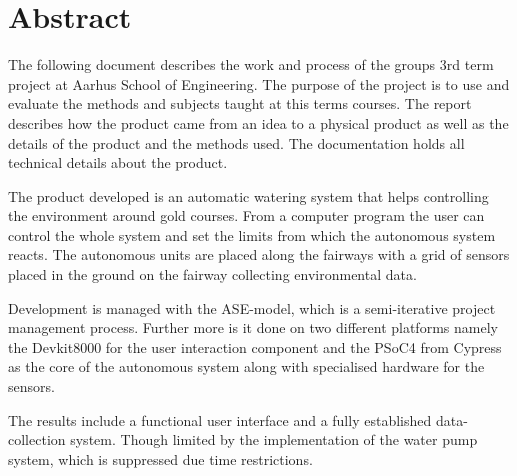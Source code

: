 \chapter*{Abstract}

The following document describes the work and process of the groups 3rd term project at Aarhus School of Engineering. The purpose of the project is to use and evaluate the methods and subjects taught at this terms courses. The report describes how the product came from an idea to a physical product as well as the details of the product and the methods used. The documentation holds all technical details about the product.

The product developed is an automatic watering system that helps controlling the environment around gold courses. From a computer program the user can control the whole system and set the limits from which the autonomous system reacts. The autonomous units are placed along the fairways with a grid of sensors placed in the ground on the fairway collecting environmental data.

Development is managed with the ASE-model, which is a semi-iterative project management process. Further more is it done on two different platforms namely the Devkit8000 for the user interaction component and the PSoC4 from Cypress as the core of the autonomous system along with specialised hardware for the sensors.

The results include a functional user interface and a fully established data-collection system. Though limited by the implementation of the water pump system, which is suppressed due time restrictions.

\afterpage{\null\newpage} %